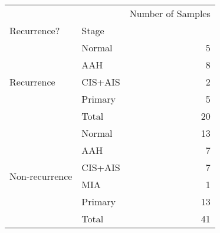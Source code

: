 \begin{tabular}{l|lr}
\toprule
               &       & Number of Samples \\
Recurrence? & Stage &                   \\
\midrule
\multirow{5}{*}{Recurrence} & Normal &                 5 \\
               & AAH &                 8 \\
               & CIS+AIS &                 2 \\
               & Primary &                 5 \\
               & Total &                20 \\
\cline{1-3}
\multirow{6}{*}{Non-recurrence} & Normal &                13 \\
               & AAH &                 7 \\
               & CIS+AIS &                 7 \\
               & MIA &                 1 \\
               & Primary &                13 \\
               & Total &                41 \\
\bottomrule
\end{tabular}
